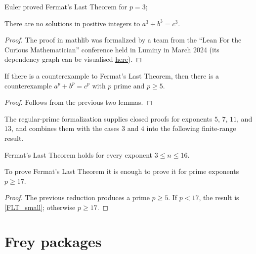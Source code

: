 Euler proved Fermat's Last Theorem for $p=3$;

\begin{lemma}\label{fermatLastTheoremThree}\leanok
{}
  There are no solutions in positive integers to $a^3+b^3=c^3$.
\end{lemma}
\begin{proof}
  \leanok
  The proof in mathlib was formalized by a team from the ``Lean For the Curious Mathematician'' conference held in Luminy in March 2024
  (its dependency graph can be visualised \href{https://pitmonticone.github.io/FLT3/blueprint/dep_graph_document.html}{\underline{here}}).
\end{proof}

\begin{corollary}\label{FermatLastTheorem.of_p_ge_5}\leanok If there is a counterexample to
  Fermat's Last Theorem, then there is a counterexample $a^p+b^p=c^p$ with $p$ prime and $p\geq 5$.
\end{corollary}
\begin{proof}\leanok Follows from the
  previous two lemmas.\end{proof}

The regular-prime formalization supplies closed proofs for exponents $5$, $7$, $11$, and $13$,
and combines them with the cases $3$ and $4$ into the following finite-range result.

\begin{lemma}\label{FLT_small}\leanok
  Fermat's Last Theorem holds for every exponent $3\leq n\leq16$.
\end{lemma}

\begin{corollary}\label{FermatLastTheorem.of_small_and_p_ge_17}
  \leanok
  To prove Fermat's Last Theorem it is enough to prove it for prime exponents $p\geq17$.
\end{corollary}
\begin{proof}\leanok
  The previous reduction produces a prime $p\geq5$. If $p<17$, the result is
  \ref{FLT_small}; otherwise $p\geq17$.
\end{proof}

\section{Frey packages}


